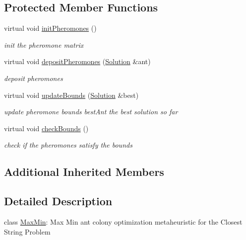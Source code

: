 \subsection*{Protected Member Functions}
\begin{DoxyCompactItemize}
\item 
virtual void \hyperlink{classMaxMin_a2d3a9fd991bc090d8b731c85f013edeb}{init\+Pheromones} ()\hypertarget{classMaxMin_a2d3a9fd991bc090d8b731c85f013edeb}{}\label{classMaxMin_a2d3a9fd991bc090d8b731c85f013edeb}

\begin{DoxyCompactList}\small\item\em init the pheromone matrix \end{DoxyCompactList}\item 
virtual void \hyperlink{classMaxMin_a0426957fa02c8bf28d527bb1ee1519d3}{deposit\+Pheromones} (\hyperlink{classSolution}{Solution} \&ant)
\begin{DoxyCompactList}\small\item\em deposit pheromones \end{DoxyCompactList}\item 
virtual void \hyperlink{classMaxMin_a6c9e927c48f3d91e2a84f2e4d2706b37}{update\+Bounds} (\hyperlink{classSolution}{Solution} \&best)\hypertarget{classMaxMin_a6c9e927c48f3d91e2a84f2e4d2706b37}{}\label{classMaxMin_a6c9e927c48f3d91e2a84f2e4d2706b37}

\begin{DoxyCompactList}\small\item\em update pheromone bounds  best\+Ant the best solution so far \end{DoxyCompactList}\item 
virtual void \hyperlink{classMaxMin_a67087a455729080bab2b12818a369241}{check\+Bounds} ()\hypertarget{classMaxMin_a67087a455729080bab2b12818a369241}{}\label{classMaxMin_a67087a455729080bab2b12818a369241}

\begin{DoxyCompactList}\small\item\em check if the pheromones satisfy the bounds \end{DoxyCompactList}\end{DoxyCompactItemize}
\subsection*{Additional Inherited Members}


\subsection{Detailed Description}
class \hyperlink{classMaxMin}{Max\+Min}\+: Max Min ant colony optimization metaheuristic for the Closest String Problem 

